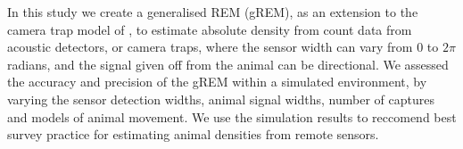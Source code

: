 In this study we create a generalised REM (gREM), as an extension to the camera trap model of \citep{rowcliffe2008estimating}, to estimate absolute density from count data from acoustic detectors, or camera traps, where the sensor width can vary from 0 to $2\pi$ radians, and the signal given off from the animal can be directional. We assessed the accuracy and precision of the gREM within a simulated environment, by varying the sensor detection widths, animal signal widths, number of captures and models of animal movement. We use the simulation results to reccomend best survey practice for estimating animal densities from remote sensors. 

